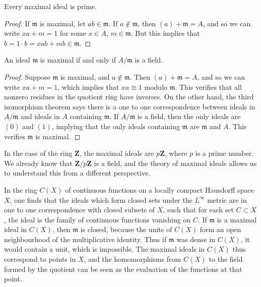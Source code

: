 \begin{theorem}
    Every maximal ideal is prime.
\end{theorem}
\begin{proof}
    If $\mathfrak{m}$ is maximal, let $ab \in \mathfrak{m}$. If $a \not \in \mathfrak{m}$, then $(a) + \mathfrak{m} = A$, and so we can write $xa + m = 1$ for some $x \in A$, $m \in \mathfrak{m}$. But this implies that $b = 1 \cdot b = xab + mb \in \mathfrak{m}$.
\end{proof}

\begin{theorem}
    An ideal $\mathfrak{m}$ is maximal if and only if $A/\mathfrak{m}$ is a field.
\end{theorem}
\begin{proof}
    Suppose $\mathfrak{m}$ is maximal, and $a \not \in \mathfrak{m}$. Then $(a) + \mathfrak{m} = A$, and so we can write $xa + m = 1$, which implies that $xa \cong 1$ modulo $\mathfrak{m}$. This verifies that all nonzero residues in the quotient ring have inverses. On the other hand, the third isomorphism theorem says there is a one to one correspondence between ideals in $A/\mathfrak{m}$ and ideals in $A$ containing $\mathfrak{m}$. If $A/\mathfrak{m}$ is a field, then the only ideals are $(0)$ and $(1)$, implying that the only ideals containing $\mathfrak{m}$ are $\mathfrak{m}$ and $A$. This verifies $\mathfrak{m}$ is maximal.
\end{proof}

\begin{example}
    In the case of the ring $\mathbf{Z}$, the maximal ideals are $p\mathbf{Z}$, where $p$ is a prime number. We already know that $\mathbf{Z}/p\mathbf{Z}$ is a field, and the theory of maximal ideals allows us to understand this from a different perspective.
\end{example}

\begin{example}
    In the ring $C(X)$ of continuous functions on a locally compact Hausdorff space $X$, one finds that the ideals which form closed sets under the $L^\infty$ metric are in one to one correspondence with closed subsets of $X$, such that for each set $C \subset X$, the ideal is the family of continuous functions vanishing on $C$. If $\mathfrak{m}$ is a maximal ideal in $C(X)$, then $\mathfrak{m}$ is closed, because the units of $C(X)$ form an open neighbourhood of the multiplicative identity. Thus if $\mathfrak{m}$ was dense in $C(X)$, it would contain a unit, which is impossible. The maximal ideals in $C(X)$ thus correspond to points in $X$, and the homomorphisms from $C(X)$ to the field formed by the quotient can be seen as the evaluation of the functions at that point.
\end{example}

